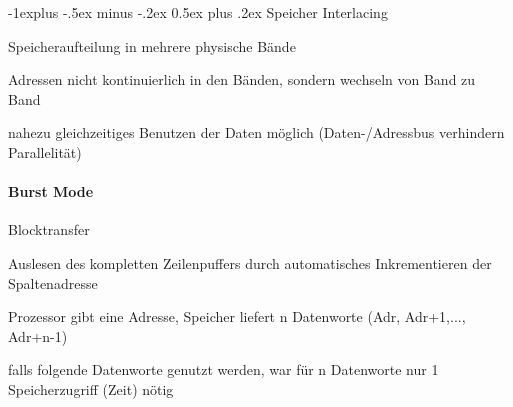 \documentclass[a4paper]{article}
\makeatletter
\renewcommand{\subsection}{\@startsection{subsection}{2}{0mm}%
                                {-1explus -.5ex minus -.2ex}%
                                {0.5ex plus .2ex}%
                                {\normalfont\normalsize\bfseries}}
\makeatother
\begin{document}
\begin{multicols}{3}
  \subsection{Speicher Interlacing}
  \begin{itemize*}
    \item Speicheraufteilung in mehrere physische Bände
    \item Adressen nicht kontinuierlich in den Bänden, sondern wechseln von Band zu Band
    \item nahezu gleichzeitiges Benutzen der Daten möglich (Daten-/Adressbus verhindern Parallelität)
  \end{itemize*}
  
  \paragraph{Burst Mode} Blocktransfer
  \begin{itemize*}
    \item Auslesen des kompletten Zeilenpuffers durch automatisches Inkrementieren der Spaltenadresse
    \item Prozessor gibt eine Adresse, Speicher liefert n Datenworte (Adr, Adr+1,..., Adr+n-1)
    \item falls folgende Datenworte genutzt werden, war für n Datenworte nur 1 Speicherzugriff (Zeit) nötig
  \end{itemize*}
  

\end{multicols}
\end{document}
